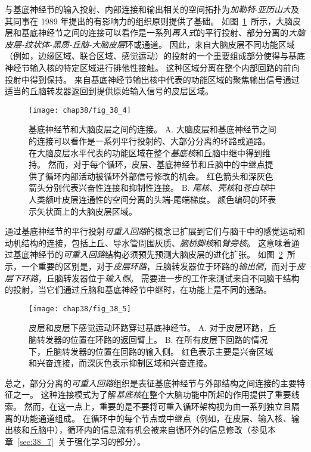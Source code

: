 与基底神经节的输入投射、内部连接和输出相关的空间拓扑为\textit{加勒特$\cdot$亚历山大}及其同事在 1989 年提出的有影响力的组织原则提供了基础。
如图~\ref{fig:38_4}~所示，大脑皮层和基底神经节之间的连接可以看作是一系列\textit{再入式}的平行投射、部分分离的\textit{大脑皮层-纹状体-黑质-丘脑-大脑皮层}环或通道。
因此，来自大脑皮层不同功能区域（例如，边缘区域、联合区域、感觉运动）的投射的一个重要组成部分使得与基底神经节输入核的特定区域进行排他性接触。
这种区域分离在整个内部回路的前向投射中得到保持。
来自基底神经节输出核中代表的功能区域的聚焦输出信号通过适当的丘脑转发器返回到提供原始输入信号的皮层区域。


\begin{figure}[htbp]
	\centering
	\texttt{[image: chap38/fig\_38\_4]}
	\caption{基底神经节和大脑皮层之间的连接。
		A. 大脑皮层和基底神经节之间的连接可以看作是一系列平行投射的、大部分分离的环路或通路。
		在大脑皮层水平代表的功能区域在整个\textit{基底核}和丘脑中继中得到维持。
		然而，对于每个循环，皮层、基底神经节和丘脑中的中继点提供了循环内部活动被循环外部信号修改的机会。
		红色箭头和深灰色箭头分别代表兴奋性连接和抑制性连接。
		B. \textit{尾核}、\textit{壳核}和\textit{苍白球}中人类额叶皮层连通性的空间分离的头端-尾端梯度。
		颜色编码的环表示矢状面上的大脑皮层区域\cite{draganski2008evidence}。}
	\label{fig:38_4}
\end{figure}


通过基底神经节的平行投射\textit{可重入回路}的概念已扩展到它们与脑干中的感觉运动和动机结构的连接，包括上丘、导水管周围灰质、\textit{脑桥脚核}和\textit{臂旁核}。
这意味着通过基底神经节的\textit{可重入回路}结构必须预先预测大脑皮层的进化扩张。
如图~\ref{fig:38_5}~所示，一个重要的区别是，对于\textit{皮层环路}，丘脑转发器位于环路的\textit{输出侧}，而对于\textit{皮层下环路}，丘脑转发器位于\textit{输入侧}。
需要进一步的工作来测试来自不同脑干结构的投射，当它们通过丘脑和基底神经节中继时，在功能上是不同的通路。


\begin{figure}[htbp]
	\centering
	\texttt{[image: chap38/fig\_38\_5]}
	\caption{皮层和皮层下感觉运动环路穿过基底神经节。
		A. 对于皮层环路，丘脑转发器的位置在环路的返回臂上。
		B. 在所有皮层下回路的情况下，丘脑转发器的位置在回路的输入侧。
		红色表示主要是兴奋区域和兴奋连接，而深灰色表示抑制区域和兴奋连接。}
	\label{fig:38_5}
\end{figure}


总之，部分分离的\textit{可重入回路}组织是表征基底神经节与外部结构之间连接的主要特征之一。
这种连接模式为了解\textit{基底核}在整个大脑功能中所起的作用提供了重要线索。
然而，在这一点上，重要的是不要将可重入循环架构视为由一系列独立且隔离的功能通道组成。
在循环中的每个节点或中继点（例如，在皮层、输入核、输出核和丘脑中），循环内的信息流有机会被来自循环外的信息修改（参见本章~\ref{sec:38_7}~关于强化学习的部分）。


